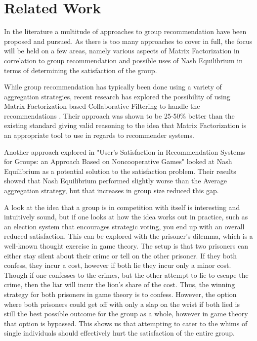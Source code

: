 \section{Related Work} \label{in:related_work}

In the literature a multitude of approaches to group recommendation have been proposed and pursued. As there is too many approaches to cover in full, the focus will be held on a few areas, namely various aspects of Matrix Factorization in correlation to group recommendation and possible uses of Nash Equilibrium in terms of determining the satisfaction of the group.

While group recommendation has typically been done using a variety of aggregation strategies, recent research has explored the possibility of using Matrix Factorization based Collaborative Filtering to handle the recommendations \cite{mfbasedcf}. Their approach was shown to be 25-50\% better than the existing standard giving valid reasoning to the idea that Matrix Factorization is an appropriate tool to use in regards to recommender systems.

Another approach explored in "User’s Satisfaction in Recommendation Systems for Groups: an Approach Based on Noncooperative Games"\cite{nashequilibrium} looked at Nash Equilibrium as a potential solution to the satisfaction problem. Their results showed that Nash Equilibrium performed slightly worse than the Average aggregation strategy, but that increases in group size reduced this gap.

A look at the idea that a group is in competition with itself is interesting and intuitively sound, but if one looks at how the idea works out in practice, such as an election system that encourages strategic voting, you end up with an overall reduced satisfaction. This can be explored with the prisoner's dilemma, which is a well-known thought exercise in game theory. The setup is that two prisoners can either stay silent about their crime or tell on the other prisoner. If they both confess, they incur a cost, however if both lie they incur only a minor cost. Though if one confesses to the crimes, but the other attempt to lie to escape the crime, then the liar will incur the lion's share of the cost. Thus, the winning strategy for both prisoners in game theory is to confess. However, the option where both prisoners could get off with only a slap on the wrist if both lied is still the best possible outcome for the group as a whole, however in game theory that option is bypassed. This shows us that attempting to cater to the whims of single individuals should effectively hurt the satisfaction of the entire group.